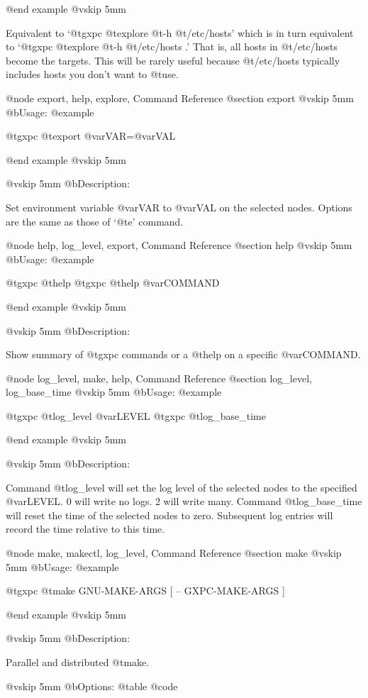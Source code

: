 @end example
@vskip 5mm

Equivalent to `@t{gxpc} @t{explore} @t{-h} @t{/etc/hosts}' which is in turn
equivalent to `@t{gxpc} @t{explore} @t{-h} @t{/etc/hosts} .'  That is, all hosts
in @t{/etc/hosts} become the targets.  This will be rarely useful
because @t{/etc/hosts} typically includes hosts you don't want to
@t{use}.

@node export, help, explore, Command Reference
@section export
@vskip 5mm
@b{Usage:}
@example

  @t{gxpc} @t{export} @var{VAR}=@var{VAL}

@end example
@vskip 5mm

@vskip 5mm
@b{Description:}


  Set environment variable @var{VAR} to @var{VAL} on the selected nodes.
Options are the same as those of `@t{e}' command.

@node help, log_level, export, Command Reference
@section help
@vskip 5mm
@b{Usage:}
@example

  @t{gxpc} @t{help}
  @t{gxpc} @t{help} @var{COMMAND}

@end example
@vskip 5mm

@vskip 5mm
@b{Description:}


  Show summary of @t{gxpc} commands or a @t{help} on a specific @var{COMMAND}.

@node log_level, make, help, Command Reference
@section log_level, log_base_time
@vskip 5mm
@b{Usage:}
@example

  @t{gxpc} @t{log_level} @var{LEVEL}
  @t{gxpc} @t{log_base_time}

@end example
@vskip 5mm

@vskip 5mm
@b{Description:}


  Command @t{log_level} will set the log level of the selected nodes
to the specified @var{LEVEL}.  0 will write no logs. 2 will write many.
Command @t{log_base_time} will reset the time of the selected nodes
to zero.  Subsequent log entries will record the time relative to
this time.

@node make, makectl, log_level, Command Reference
@section make
@vskip 5mm
@b{Usage:}
@example

  @t{gxpc} @t{make} GNU-MAKE-ARGS [ -- GXPC-MAKE-ARGS ]

@end example
@vskip 5mm

@vskip 5mm
@b{Description:}


  Parallel and distributed @t{make}.

@vskip 5mm
@b{Options:}
@table @code



